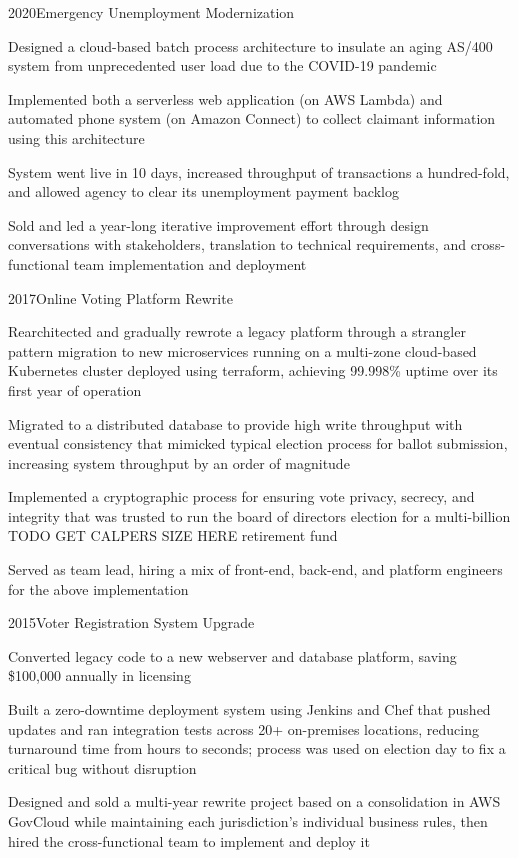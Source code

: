 \project
  {2020}{Emergency Unemployment Modernization}
  {\begin{achievements}
    \item Designed a cloud-based batch process architecture to insulate an aging AS/400 system from unprecedented user load due to the COVID-19 pandemic
    \item Implemented both a serverless web application (on AWS Lambda) and automated phone system (on Amazon Connect) to collect claimant information using this architecture
    \item System went live in 10 days, increased throughput of transactions a hundred-fold, and allowed agency to clear its unemployment payment backlog
    \item Sold and led a year-long iterative improvement effort through design conversations with stakeholders, translation to technical requirements, and cross-functional team implementation and deployment
  \end{achievements}}

\project
  {2017}{Online Voting Platform Rewrite}
  {\begin{achievements}
    \item Rearchitected and gradually rewrote a legacy platform through a strangler pattern migration to new microservices running on a multi-zone cloud-based Kubernetes cluster deployed using terraform, achieving 99.998\% uptime over its first year of operation
    \item Migrated to a distributed database to provide high write throughput with eventual consistency that mimicked typical election process for ballot submission, increasing system throughput by an order of magnitude
    \item Implemented a cryptographic process for ensuring vote privacy, secrecy, and integrity that was trusted to run the board of directors election for a multi-billion TODO GET CALPERS SIZE HERE retirement fund
    \item Served as team lead, hiring a mix of front-end, back-end, and platform engineers for the above implementation
   \end{achievements}}

\project
  {2015}{Voter Registration System Upgrade}
  {\begin{achievements}
    \item Converted legacy code to a new webserver and database platform, saving \$100,000 annually in licensing
    \item Built a zero-downtime deployment system using Jenkins and Chef that pushed updates and ran integration tests across 20+ on-premises locations, reducing turnaround time from hours to seconds; process was used on election day to fix a critical bug without disruption
    \item Designed and sold a multi-year rewrite project based on a consolidation in AWS GovCloud while maintaining each jurisdiction's individual business rules, then hired the cross-functional team to implement and deploy it
  \end{achievements}}
